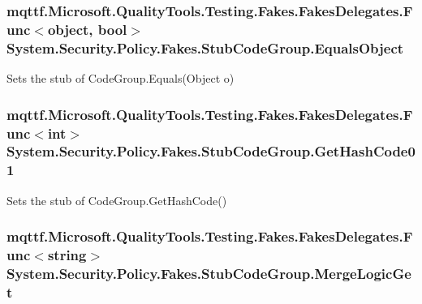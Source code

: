 \hypertarget{class_system_1_1_security_1_1_policy_1_1_fakes_1_1_stub_code_group_a21b2d0b399480c4837e411ccfada8595}{
\subsubsection[{Equals\-Object}]{\setlength{\rightskip}{0pt plus 5cm}mqttf.\-Microsoft.\-Quality\-Tools.\-Testing.\-Fakes.\-Fakes\-Delegates.\-Func$<$object, bool$>$ System.\-Security.\-Policy.\-Fakes.\-Stub\-Code\-Group.\-Equals\-Object}}\label{class_system_1_1_security_1_1_policy_1_1_fakes_1_1_stub_code_group_a21b2d0b399480c4837e411ccfada8595}


Sets the stub of Code\-Group.\-Equals(\-Object o)

\hypertarget{class_system_1_1_security_1_1_policy_1_1_fakes_1_1_stub_code_group_ab41317a07ca4e78e6dfd066e09ffd0a5}{
\subsubsection[{Get\-Hash\-Code01}]{\setlength{\rightskip}{0pt plus 5cm}mqttf.\-Microsoft.\-Quality\-Tools.\-Testing.\-Fakes.\-Fakes\-Delegates.\-Func$<$int$>$ System.\-Security.\-Policy.\-Fakes.\-Stub\-Code\-Group.\-Get\-Hash\-Code01}}\label{class_system_1_1_security_1_1_policy_1_1_fakes_1_1_stub_code_group_ab41317a07ca4e78e6dfd066e09ffd0a5}


Sets the stub of Code\-Group.\-Get\-Hash\-Code()

\hypertarget{class_system_1_1_security_1_1_policy_1_1_fakes_1_1_stub_code_group_ace495e5d87ff648cc3973fa25d15f6ec}{
\subsubsection[{Merge\-Logic\-Get}]{\setlength{\rightskip}{0pt plus 5cm}mqttf.\-Microsoft.\-Quality\-Tools.\-Testing.\-Fakes.\-Fakes\-Delegates.\-Func$<$string$>$ System.\-Security.\-Policy.\-Fakes.\-Stub\-Code\-Group.\-Merge\-Logic\-Get}}\label{class_system_1_1_security_1_1_policy_1_1_fakes_1_1_stub_code_group_ace495e5d87ff648cc3973fa25d15f6ec}


